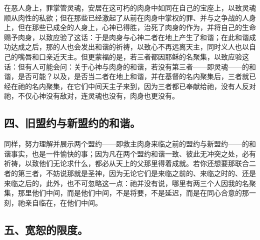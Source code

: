 在恶人身上，罪掌管灵魂，安居在这可朽的肉身中如同在自己的宝座上，以致灵魂顺从肉性的私欲；但在那些已经激起了从前在肉身中掌权的罪、并与之争战的人身上，但在那些已成全的人身上，心神已得胜，治死了肉身的作为，并将自己的生命赐予肉身，以致应验了这话：于是肉身与心神二者在地上产生了和谐；在此和谐成功达成之后，那的人也会发出和谐的祈祷，以致心不再远离天主，同时义人也以自己的嘴唇和口亲近天主。但更蒙福的是，若三者都因耶稣的名聚集，以致应验这话：但有人可能会问：关于心神与肉身的和谐，若没有第三者——即灵魂——的和谐，是否可能？以及，是否当二者在地上和谐，并在基督的名内聚集后，三者就已经在祂的名内聚集，在它们中间天主子来到，因为三者都已奉献给祂，没有人反对祂，不仅心神没有敌对，连灵魂也没有，肉身也更没有。\par


\subsection{四、旧盟约与新盟约的和谐。}

同样，努力理解并展示两个盟约——即救主肉身来临之前的盟约与新盟约——的和谐事实，也是一件愉快的事；因为凡在两个盟约和谐一致、彼此无冲突之处，必有祈祷，以致他们无论求什么，都必从天上的父那里得着成就。若你还想要那联合二者的第三者，不妨说那就是圣神，因为无论它们是来临之前的、来临之时的、还是来临之后的，此外，也不可忽略这一点：祂并没有说，哪里有两三个人因我的名聚集，那里他们中间，而是他们中间，不是将要，不是延迟，而是在同心合意的那一刻，祂亲自临在，在他们中间。\par


\subsection{五、宽恕的限度。}

